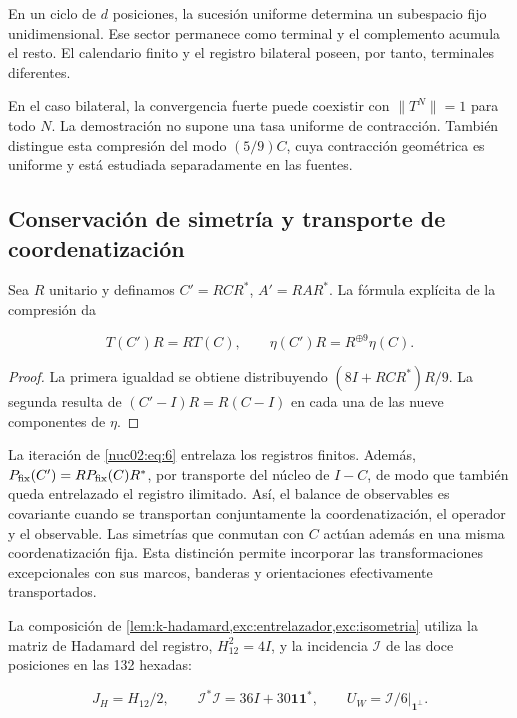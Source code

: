 \begin{corollary}
En un ciclo de \(d\) posiciones, la sucesión uniforme determina un subespacio fijo unidimensional. Ese sector permanece como terminal y el complemento acumula el resto. El calendario finito y el registro bilateral poseen, por tanto, terminales diferentes.
\end{corollary}

En el caso bilateral, la convergencia fuerte puede coexistir con \(\|T^N\|=1\) para todo \(N\). La demostración no supone una tasa uniforme de contracción. También distingue esta compresión del modo \((5/9)C\), cuya contracción geométrica es uniforme y está estudiada separadamente en las fuentes.

\subsection{Conservación de simetría y transporte de coordenatización}

Sea \(R\) unitario y definamos \(C'=RCR^*\), \(A'=RAR^*\). La fórmula explícita de la compresión da

\begin{equation}
T(C')R=RT(C),\qquad
\eta(C')R=R^{\oplus9}\eta(C).\label{nuc02:eq:6}
\end{equation}

\begin{proof}
La primera igualdad se obtiene distribuyendo \((8I+RCR^*)R/9\). La segunda resulta de \((C'-I)R=R(C-I)\) en cada una de las nueve componentes de \(\eta\).
\end{proof}

La iteración de \eqref{nuc02:eq:6} entrelaza los registros finitos. Además, \(P_{\rm fix}(C')=RP_{\rm fix}(C)R^*\), por transporte del núcleo de \(I-C\), de modo que también queda entrelazado el registro ilimitado. Así, el balance de observables es covariante cuando se transportan conjuntamente la coordenatización, el operador y el observable. Las simetrías que conmutan con \(C\) actúan además en una misma coordenatización fija. Esta distinción permite incorporar las transformaciones excepcionales con sus marcos, banderas y orientaciones efectivamente transportados.

La composición de \cref{lem:k-hadamard,exc:entrelazador,exc:isometria} utiliza la matriz de Hadamard del registro, \(H_{12}^2=4I\), y la incidencia \(\mathcal I\) de las doce posiciones en las 132 hexadas:

\[
J_H=H_{12}/2,\qquad
\mathcal I^*\mathcal I=36I+30\mathbf1\mathbf1^*,\qquad
U_W=\mathcal I/6\big|_{\mathbf1^\perp}.
\]

